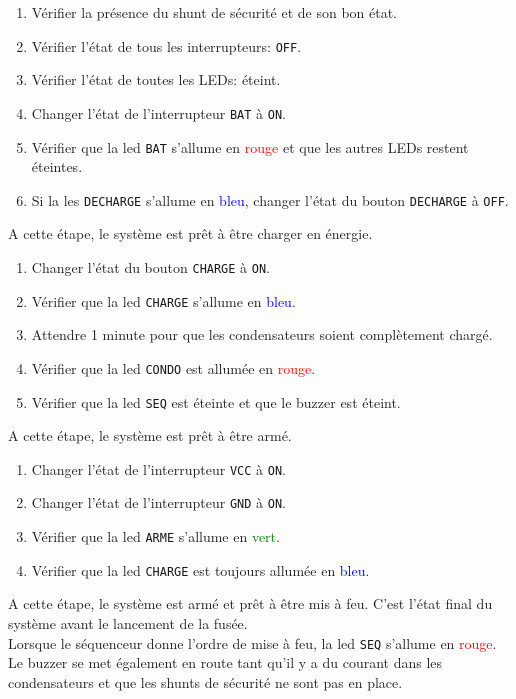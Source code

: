 \begin{enumerate}
    \item Vérifier la présence du shunt de sécurité et de son bon état. 
    \item Vérifier l'état de tous les interrupteurs: \verb|OFF|.
    \item Vérifier l'état de toutes les LEDs: éteint.
    \item Changer l'état de l'interrupteur \verb|BAT| à \verb|ON|.
    \item Vérifier que la led \verb|BAT| s'allume en \textcolor{red}{rouge} et que les autres LEDs restent éteintes.
    \item Si la les \verb|DECHARGE| s'allume en \textcolor{blue}{bleu}, changer l'état du bouton \verb|DECHARGE| à \verb|OFF|.
\end{enumerate}
A cette étape, le système est prêt à être charger en énergie.
\begin{enumerate}[resume]
    \item Changer l'état du bouton \verb|CHARGE| à \verb|ON|.
    \item Vérifier que la led \verb|CHARGE| s'allume en \textcolor{blue}{bleu}.
    \item Attendre 1 minute pour que les condensateurs soient complètement chargé.
    \item Vérifier que la led \verb|CONDO| est allumée en \textcolor{red}{rouge}.
    \item Vérifier que la led \verb|SEQ| est éteinte et que le buzzer est éteint.
\end{enumerate}
A cette étape, le système est prêt à être armé.
\begin{enumerate}[resume]
    \item Changer l'état de l'interrupteur \verb|VCC| à \verb|ON|.
    \item Changer l'état de l'interrupteur \verb|GND| à \verb|ON|.
    \item Vérifier que la led \verb|ARME| s'allume en \textcolor{green}{vert}.
    \item Vérifier que la led \verb|CHARGE| est toujours allumée en \textcolor{blue}{bleu}.
\end{enumerate}
A cette étape, le système est armé et prêt à être mis à feu. C'est l'état final du système avant le lancement de la fusée.\\

Lorsque le séquenceur donne l'ordre de mise à feu, la led \verb|SEQ| s'allume en \textcolor{red}{rouge}. Le buzzer se met
également en route tant qu'il y a du courant dans les condensateurs et que les shunts de sécurité ne sont pas en place.

\newpage
